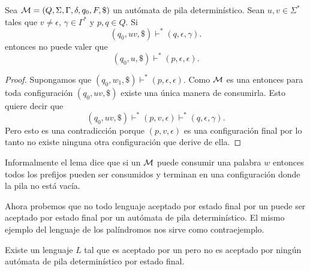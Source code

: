 \documentclass[tesis.tex]{subfiles}
\begin{document}
\begin{lema}\label{lema_configuracion_prefijo}
	Sea ${\cal M} = (Q, \Sigma, \Gamma, \delta, q_0, F, \$)$ un autómata de pila determinístico.
	Sean $u, v \in \Sigma^*$ tales que $v \neq \epsilon$, $\gamma \in \Gamma^*$ y $p,q \in Q$.
	Si
	\[
		(q_{0},uv, \$) \vdash^* (q,\epsilon, \gamma).
	\]
	entonces no puede valer que 
	\[
		(q_{0},u, \$) \vdash^* (p, \epsilon, \epsilon).
	\]
\end{lema}
\begin{proof}
	Supongamos que $(q_{0},w_{1}, \$) \vdash^* (p, \epsilon, \epsilon)$.
	Como $\cal M$ es una \APD entonces para toda configuración $(q_{0}, uv, \$)$ existe una única manera de consumirla.
	Esto quiere decir que 
	\[
		(q_{0},uv, \$) \vdash^* (p,v, \epsilon) \vdash^* (q,\epsilon, \gamma).
	\]
	Pero esto es una contradicción porque $(p, v, \epsilon)$ es una configuración final por lo tanto no existe ninguna otra configuración que derive de ella.
\end{proof}

Informalmente el lema dice que si un \APD $\cal M$ puede consumir una palabra $w$ entonces todos los prefijos pueden ser consumidos y terminan en una configuración donde la pila no está vacía.

Ahora probemos que no todo lenguaje aceptado por estado final por un \APND puede ser aceptado por estado final por un autómata de pila determinístico.
El mismo ejemplo del lenguaje de los palíndromos nos sirve como contraejemplo.
\begin{prop}
	Existe un lenguaje $L$ tal que es aceptado por un \APND pero no es aceptado por ningún autómata de pila determinístico por estado final.
\end{prop}
\end{document}
